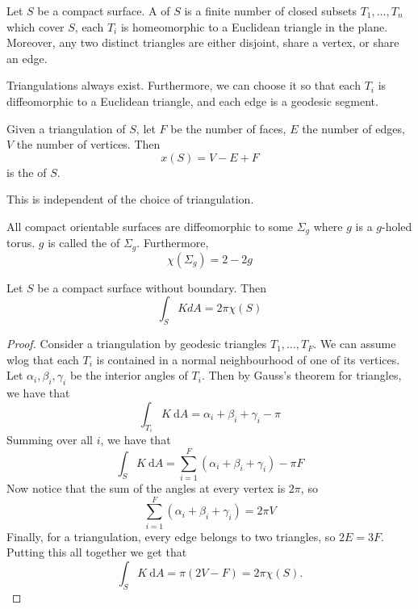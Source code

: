 \documentclass[10pt]{article}
\begin{document}
\begin{definition}[Triangulation]
    Let $S$ be a compact surface. A  of $S$ is a finite number of closed subsets $T_1, \ldots, T_n$ which cover $S$, each $T_i$ is homeomorphic to a Euclidean triangle in the plane. Moreover, any two distinct triangles are either disjoint, share a vertex, or share an edge.
\end{definition}

\begin{theorem}
  Triangulations always exist. Furthermore, we can choose it so that each $T_i$ is diffeomorphic to a Euclidean triangle, and each edge is a geodesic segment.
\end{theorem}

\begin{definition}
    Given a triangulation of $S$, let $F$ be the number of faces, $E$ the number of edges, $V$ the number of vertices. Then
$$
x(S)=V-E+F
$$
is the  of $S$.
\end{definition}

This is independent of the choice of triangulation.

\begin{proposition}
All compact orientable surfaces are diffeomorphic to some $\Sigma_g$ where $g$ is a $g$-holed torus. $g$ is called the  of $\Sigma_g$. Furthermore,
$$
\chi\left(\Sigma_g\right)=2-2 g
$$
\end{proposition}


\begin{theorem}
    Let $S$ be a compact surface without boundary. Then
$$
\int_S K d A=2 \pi \chi(S)
$$
\end{theorem}
\begin{proof}
    Consider a triangulation by geodesic triangles $T_1, \ldots, T_F$. We can assume wlog that each $T_i$ is contained in a normal neighbourhood of one of its vertices.
Let $\alpha_i, \beta_i, \gamma_i$ be the interior angles of $T_i$. Then by Gauss's theorem for triangles, we have that
$$
\int_{T_i} K \mathrm{~d} A=\alpha_i+\beta_i+\gamma_i-\pi
$$
Summing over all $i$, we have that
$$
\int_S K \mathrm{~d} A=\sum_{i=1}^F\left(\alpha_i+\beta_i+\gamma_i\right)-\pi F
$$
Now notice that the sum of the angles at every vertex is $2 \pi$, so
$$
\sum_{i=1}^F\left(\alpha_i+\beta_i+\gamma_i\right)=2 \pi V
$$
Finally, for a triangulation, every edge belongs to two triangles, so $2 E=3 F$. Putting this all together we get that
$$
\int_S K \mathrm{~d} A=\pi(2 V-F)=2 \pi \chi(S).
$$
\end{proof}
\end{document}
